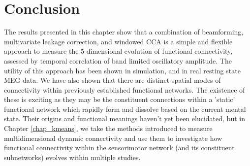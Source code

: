 \section{Conclusion}
The results presented in this chapter show that a combination of beamforming, multivariate leakage correction, and windowed CCA is a simple and flexible approach to measure the 5-dimensional evolution of functional connectivity, assessed by temporal correlation of band limited oscillatory amplitude. The utility of this approach has been shown in simulation, and in real resting state MEG data. We have also shown that there are distinct spatial modes of connectivity within previously established functional networks. The existence of these is exciting as they may be the constituent connections within a 'static' functional network which rapidly form and dissolve based on the current mental state. Their origins and functional meanings haven't yet been elucidated, but in Chapter \ref{chap_kmeans}, we take the methods introduced to measure multidimensional dynamic connectivity and use them to investigate how functional connectivity within the sensorimotor network (and its constituent subnetworks) evolves within multiple studies.  
